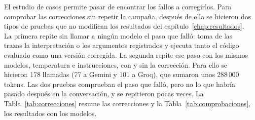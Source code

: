 El estudio de casos permite pasar de encontrar los fallos a corregirlos. Para
comprobar las correcciones sin repetir la campaña, después de ella se hicieron
dos tipos de pruebas que no modifican los resultados del
capítulo~\ref{chap:resultados}. La primera repite sin llamar a ningún modelo el
paso que falló: toma de las trazas la interpretación o los argumentos
registrados y ejecuta tanto el código evaluado como una versión corregida. La
segunda repite ese paso con los mismos modelos, temperatura e instrucciones,
con y sin la corrección. Para ello se hicieron 178 llamadas (77 a Gemini y 101
a Groq), que sumaron unos 288\,000 tokens. Las dos pruebas comprueban el paso
que falló, pero no lo que habría pasado después en la conversación, y se
repitieron pocas veces. La Tabla~\ref{tab:correcciones} resume las correcciones
y la Tabla~\ref{tab:comprobaciones}, los resultados con los modelos.

